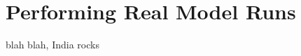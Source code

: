 \documentclass[main.tex]{subfiles}
\begin{document}
\newpage
\setcounter{section}{3}
\section{Performing Real Model Runs}

blah blah, India rocks
\end{document}
